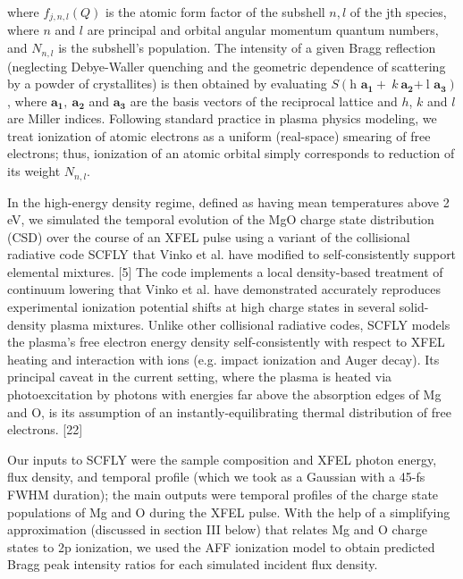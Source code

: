 where \(f_{j,n,l}\left( Q \right)\) is the atomic form factor of the
subshell \(n,l\) of the jth species, where \(n\) and \(l\) are principal
and orbital angular momentum quantum numbers, and \(N_{n,l}\) is the
subshell's population. The intensity of a given Bragg reflection
(neglecting Debye-Waller quenching and the geometric dependence of
scattering by a powder of crystallites) is then obtained by evaluating
\(S\left( \text{h\ }\mathbf{a}_{\mathbf{1}} + \ k\ \mathbf{a}_{\mathbf{2}}\mathbf{+ \ }\text{l\ }\mathbf{a}_{\mathbf{3}} \right)\),
where \(\mathbf{a}_{\mathbf{1}}\mathbf{,\ }\mathbf{a}_{\mathbf{2}}\) and
\(\mathbf{a}_{\mathbf{3}}\) are the basis vectors of the reciprocal
lattice and \(h\), \(k\) and \(l\) are Miller indices. Following
standard practice in plasma physics modeling, we treat ionization of
atomic electrons as a uniform (real-space) smearing of free electrons;
thus, ionization of an atomic orbital simply corresponds to reduction of
its weight \(N_{n,l}\).

In the high-energy density regime, defined as having mean temperatures
above 2 eV, we simulated the temporal evolution of the MgO charge state
distribution (CSD) over the course of an XFEL pulse using a variant of
the collisional radiative code SCFLY that Vinko et al. have modified to
self-consistently support elemental mixtures. {[}5{]} The code
implements a local density-based treatment of continuum lowering that
Vinko et al. have demonstrated accurately reproduces experimental
ionization potential shifts at high charge states in several
solid-density plasma mixtures. Unlike other collisional radiative codes,
SCFLY models the plasma's free electron energy density self-consistently
with respect to XFEL heating and interaction with ions (e.g. impact
ionization and Auger decay). Its principal caveat in the current
setting, where the plasma is heated via photoexcitation by photons with
energies far above the absorption edges of Mg and O, is its assumption
of an instantly-equilibrating thermal distribution of free electrons.
{[}22{]}

Our inputs to SCFLY were the sample composition and XFEL photon energy,
flux density, and temporal profile (which we took as a Gaussian with a
45-fs FWHM duration); the main outputs were temporal profiles of the
charge state populations of Mg and O during the XFEL pulse. With the
help of a simplifying approximation (discussed in section III below)
that relates Mg and O charge states to 2p ionization, we used the AFF
ionization model to obtain predicted Bragg peak intensity ratios for
each simulated incident flux density.

